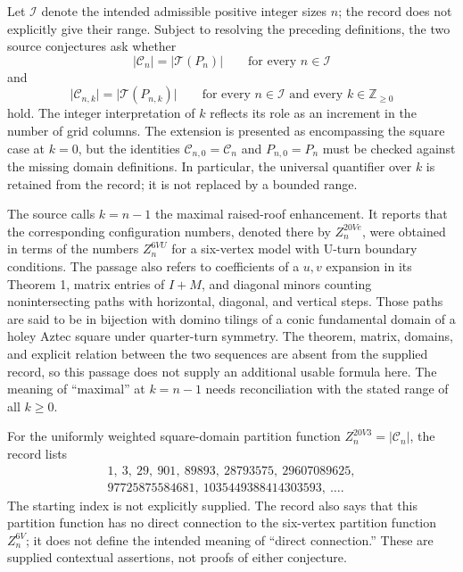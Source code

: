\documentclass[11pt]{article}
\begin{document}
Let \(\mathcal I\) denote the intended admissible positive integer sizes \(n\); the record does not explicitly give their range. Subject to resolving the preceding definitions, the two source conjectures ask whether
\[
  \lvert\mathcal C_n\rvert=\lvert\mathcal T(P_n)\rvert
  \qquad\text{for every }n\in\mathcal I
  \tag{Conjecture 3}
\]
and
\[
  \lvert\mathcal C_{n,k}\rvert=\lvert\mathcal T(P_{n,k})\rvert
  \qquad\text{for every }n\in\mathcal I
  \text{ and every }k\in\mathbb Z_{\geq 0}
  \tag{Conjecture 4}
\]
hold. The integer interpretation of \(k\) reflects its role as an increment in the number of grid columns. The extension is presented as encompassing the square case at \(k=0\), but the identities \(\mathcal C_{n,0}=\mathcal C_n\) and \(P_{n,0}=P_n\) must be checked against the missing domain definitions. In particular, the universal quantifier over \(k\) is retained from the record; it is not replaced by a bounded range.

The source calls \(k=n-1\) the maximal raised-roof enhancement. It reports that the corresponding configuration numbers, denoted there by \(Z_n^{20Ve}\), were obtained in terms of the numbers \(Z_n^{6VU}\) for a six-vertex model with U-turn boundary conditions. The passage also refers to coefficients of a \(u,v\) expansion in its Theorem 1, matrix entries of \(I+M\), and diagonal minors counting nonintersecting paths with horizontal, diagonal, and vertical steps. Those paths are said to be in bijection with domino tilings of a conic fundamental domain of a holey Aztec square under quarter-turn symmetry. The theorem, matrix, domains, and explicit relation between the two sequences are absent from the supplied record, so this passage does not supply an additional usable formula here. The meaning of ``maximal'' at \(k=n-1\) needs reconciliation with the stated range of all \(k\geq0\).

For the uniformly weighted square-domain partition function \(Z_n^{20V3}=\lvert\mathcal C_n\rvert\), the record lists
\[
\begin{gathered}
1,\ 3,\ 29,\ 901,\ 89893,\ 28793575,\ 29607089625,\\
97725875584681,\ 1035449388414303593,\ \ldots .
\end{gathered}
\]
The starting index is not explicitly supplied. The record also says that this partition function has no direct connection to the six-vertex partition function \(Z_n^{6V}\); it does not define the intended meaning of ``direct connection.'' These are supplied contextual assertions, not proofs of either conjecture.
\end{document}
